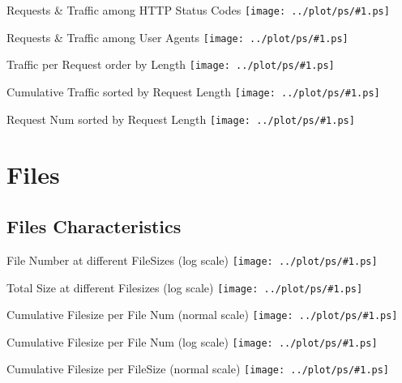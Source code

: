 \documentclass{beamer}
\newcommand\graph[1]{{\texttt{[image: ../plot/ps/\#1.ps]}}}
\begin{document}
\begin{frame}{Requests \& Traffic among HTTP Status Codes}
\graph{req-status-code}
\end{frame}


\begin{frame}{Requests \& Traffic among User Agents}
\graph{req-user-agent}
\end{frame}


\begin{frame}{Traffic per Request order by Length}
\graph{req-traffic}
\end{frame}

\begin{frame}{Cumulative Traffic sorted by Request Length}
\graph{req-traffic-acc}
\end{frame}

\begin{frame}{Request Num sorted by Request Length}
\graph{req-traffic-all}
\end{frame}


\section{Files}

\subsection{Files Characteristics}

\begin{frame}{File Number at different FileSizes (log scale)}
\graph{file-size-all}
\end{frame}

\begin{frame}{Total Size at different Filesizes (log scale)}
\graph{file-size-total}
\end{frame}

\begin{frame}{Cumulative Filesize per File Num (normal scale)}
\graph{file-num-size}
\end{frame}

\begin{frame}{Cumulative Filesize per File Num (log scale)}
\graph{file-num-size-log}
\end{frame}

\begin{frame}{Cumulative Filesize per FileSize (normal scale)}
\graph{file-size-acc-nologscale}
\end{frame}
\end{document}
